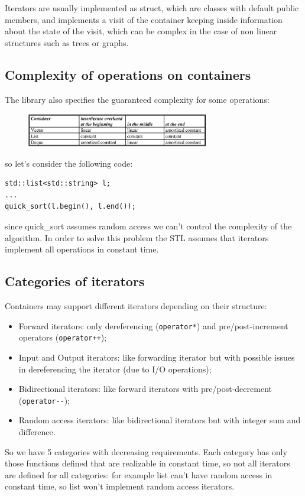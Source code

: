 Iterators are usually implemented as struct, which are classes with default public members, and implements a visit of the container keeping inside information about the state of the visit, which can be complex in the case of non linear structures such as trees or graphs.

\subsection{Complexity of operations on containers}
The library also specifies the guaranteed complexity for some operations:
\begin{figure}[H]
    \centering
    \includegraphics[width=300px]{images/6_STL/complexity.png}
\end{figure}
so let's consider the following code:
\begin{verbatim}
std::list<std::string> l;
...
quick_sort(l.begin(), l.end());
\end{verbatim}
since quick\_sort assumes random access we can't control the complexity of the algorithm.
In order to solve this problem the STL assumes that iterators implement all operations in constant time.

\subsection{Categories of iterators}
Containers may support different iterators depending on their structure:
\begin{itemize}
    \item Forward iterators: only dereferencing (\verb|operator*|) and pre/post-increment operators (\verb|operator++|);

    \item Input and Output iterators: like forwarding iterator but with possible issues in dereferencing the iterator (due to I/O operations);

    \item Bidirectional iterators: like forward iterators with pre/post-decrement (\verb|operator--|);

    \item Random access iterators: like bidirectional iterators but with integer sum and difference.
\end{itemize}
So we have 5 categories with decreasing requirements.
Each category has only those functions defined that are realizable in constant time, so not all iterators are defined for all categories: for example list can't have random access in constant time, so list won't implement random access iterators.

